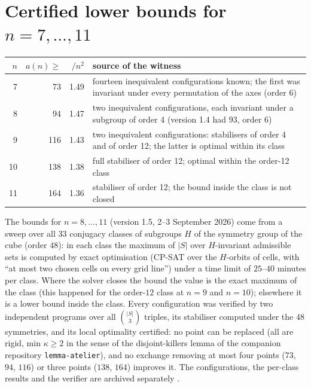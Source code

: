 \documentclass[11pt,a4paper]{article}
\begin{document}
\section{Certified lower bounds for $n=7,\dots,11$}
\begin{center}\begin{tabular}{rrrl}\toprule
$n$ & $a(n)\ge$ & $/n^2$ & source of the witness\\\midrule
7 & 73 & 1.49 & fourteen inequivalent configurations known; the first was invariant under every permutation of the axes (order 6)\\
8 & 94 & 1.47 & two inequivalent configurations, each invariant under a subgroup of order 4 (version 1.4 had $93$, order 6)\\
9 & 116 & 1.43 & two inequivalent configurations: stabilisers of order 4 and of order 12; the latter is optimal within its class\\
10 & 138 & 1.38 & full stabiliser of order 12; optimal within the order-12 class\\
11 & 164 & 1.36 & stabiliser of order 12; the bound inside the class is not closed\\\bottomrule
\end{tabular}\end{center}
The bounds for $n=8,\dots,11$ (version 1.5, 2--3 September 2026) come from a sweep over all $33$ conjugacy
classes of subgroups $H$ of the symmetry group of the cube (order $48$): in each class the maximum of $|S|$
over $H$-invariant admissible sets is computed by exact optimisation (CP-SAT over the $H$-orbits of cells, with
``at most two chosen cells on every grid line'') under a time limit of $25$--$40$ minutes per class.  Where the
solver closes the bound the value is the exact maximum of the class (this happened for the order-$12$ class at
$n=9$ and $n=10$); elsewhere it is a lower bound inside the class.  Every configuration was verified by two
independent programs over all $\binom{|S|}{3}$ triples, its stabiliser computed under the $48$ symmetries, and
its local optimality certified: no point can be replaced (all are rigid, min $\kappa\ge2$ in the sense of the
disjoint-killers lemma of the companion repository \texttt{lemma-atelier}), and no exchange removing at most
four points ($73$, $94$, $116$) or three points ($138$, $164$) improves it.  The configurations, the per-class
results and the verifier are archived separately \cite{Witnesses}.
\end{document}
